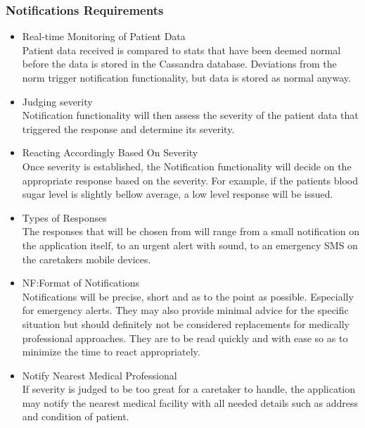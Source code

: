 \subsubsection{Notifications Requirements}
        	\begin{itemize}
            	\item{Real-time Monitoring of Patient Data\\Patient data received is compared to stats that have been deemed normal before the data is stored in the Cassandra database. Deviations from the norm trigger notification functionality, but data is stored as normal anyway.}
                \item{Judging severity\\Notification functionality will then assess the severity of the patient data that triggered the response and determine its severity.}
                \item{Reacting Accordingly Based On Severity\\ Once severity is established, the Notification functionality will decide on the appropriate response based on the severity. For example, if the patients blood sugar level is slightly bellow average, a low level response will be issued.}
                \item{Types of Responses\\The responses that will be chosen from will range from a small notification on the application itself, to an urgent alert with sound, to an emergency SMS on the caretakers mobile devices.}
                \item{NF:Format of Notifications\\Notifications will be precise, short and as to the point as possible. Especially for emergency alerts. They may also provide minimal advice for the specific situation but should definitely not be considered replacements for medically professional approaches. They are to be read quickly and with ease so as to minimize the time to react appropriately.}
                \item{Notify Nearest Medical Professional\\ If severity is judged to be too great for a caretaker to handle, the application may notify the nearest medical facility with all needed details such as address and condition of patient.}
            \end{itemize}
